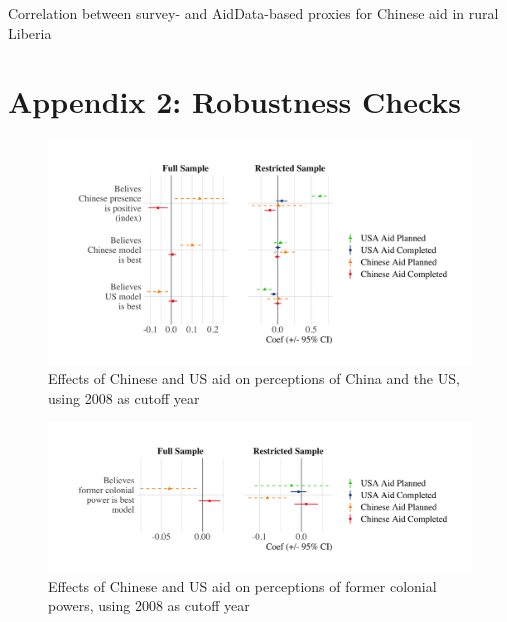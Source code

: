 \documentclass[9pt]{article}
\begin{document}
\setlength{\tabcolsep}{5pt}
\begin{table}[H]
\caption{Correlation between survey- and AidData-based proxies for Chinese aid in rural Liberia}
\label{reg}
\centering
\end{table}

\newpage
\section{Appendix 2: Robustness Checks}

\begin{figure}[H]
\centering
\includegraphics[width=1\textwidth]{figures/figure_a4.png}
\caption{Effects of Chinese and US aid on perceptions of China and the US, using 2008 as cutoff year}
\end{figure}

\begin{figure}[H]
\centering
\includegraphics[width=1\textwidth]{figures/figure_a5.png}
\caption{Effects of Chinese and US aid on perceptions of former colonial powers, using 2008 as cutoff year}
\end{figure}
\end{document}
